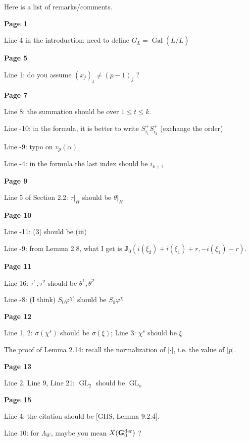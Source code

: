 \documentclass{amsart}
\DeclareMathOperator{\GL}{\mathrm GL}
\DeclareMathOperator{\Gal}{\mathrm Gal}
\theoremstyle{definition}
\newcommand{\vv}{\vspace{2mm}}
\begin{document}
\noindent Here is a list of  remarks/comments.\bigskip

\vv

 \noindent\textbf{Page 1}
 
Line 4 in the introduction: need to define $G_L=\Gal(\overline{L}/L)$
\vv


 \noindent\textbf{Page 5}
 
 Line 1: do you assume $(x_j)_j\neq (p-1)_j$ ?
 
\vv

 \noindent\textbf{Page 7}
 
 Line 8: the summation should be  over $1\leq t\leq k$.
 
 Line -10: in the formula, it is better to write $S_{i_1}^+S_{i_2}^+$ (exchange the order)
 
 Line -9: typo on $v_p(\alpha)$
 
Line -4: in the formula the last index should be $i_{k+1}$ 

\vv
 \noindent\textbf{Page 9}
 
 

Line 5 of Section 2.2: $\tau|_H$ should be $\theta|_H$

\vv
 \noindent\textbf{Page 10}

Line -11: (3) should be (iii)

Line -9: from Lemma 2.8, what I get is $\mathbf{J}_0(i(\xi_2)+i(\xi_1)+r, -i(\xi_1)-r)$. 
 
\vv

 \noindent\textbf{Page 11}

Line 16: $\tau^1,\tau^2$ should be $\theta^1,\theta^2$
 
  
Line -8: (I think) $S_0\varphi^{\chi^s}$ should be $S_0\varphi^{\chi}$
  
\vv
 \noindent\textbf{Page 12}
 
Line 1, 2: $\sigma(\chi^s)$ should be $\sigma(\xi)$; Line 3: $\chi^s$ should be $\xi$ 

The proof of Lemma 2.14: recall the normalization of $|\cdot|$, i.e. the value of $|p|$.

\vv
 \noindent\textbf{Page 13}
 
Line 2, Line 9, Line 21: $\GL_2$ should be $\GL_n$ 
 
  
\vv 
  \noindent\textbf{Page 15}

Line 4: the citation should be [GHS, Lemma 9.2.4].

Line 10: for $\Lambda_W$, maybe you mean $X(\mathbf{G}_{0}^{\rm der})$ ?

\vv
\end{document}
